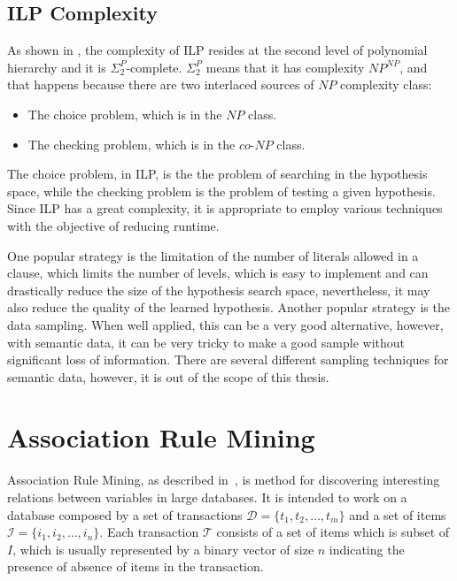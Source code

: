 \subsection{ILP Complexity}

As shown in \citet{DBLP:journals/ngc/GottlobLS99}, the complexity of ILP resides at the second level of polynomial
hierarchy and it is $\Sigma_2^P$-complete. $\Sigma_2^P$ means that it has complexity $NP^{NP}$, and that happens
because there are two interlaced sources of $NP$ complexity class:
\begin{itemize}
 \item The choice problem, which is in the $NP$ class.
 \item The checking problem, which is in the $co$-$NP$ class.
\end{itemize}

The choice problem, in ILP, is the the problem of searching in the hypothesis space, while the checking problem is the
problem of testing a given hypothesis. Since ILP has a great complexity, it is appropriate to employ various techniques
with the objective of reducing runtime.

One popular strategy is the limitation of the number of literals allowed in a clause, which limits the number of
levels, which is easy to implement and can drastically reduce the size of the hypothesis search space, nevertheless, it
may also reduce the quality of the learned hypothesis. Another popular strategy is the data sampling. When well applied,
this can be a very good alternative, however, with semantic data, it can be very tricky to make a good sample without
significant loss of information. There are several different sampling techniques for semantic data, however, it is out
of the scope of this thesis.


\section{Association Rule Mining}
\label{sec:rw-arm}

Association Rule Mining, as described in~\citet{Agrawal:1993:MAR:170036.170072}, is method for discovering interesting
relations between variables in large databases. It is intended to work on a database composed by a set of transactions
$\mathcal{D}=\{t_1,t_2,\ldots,t_m\}$ and a set of items $\mathcal{I}=\{i_1,i_2,\ldots,i_n\}$. Each transaction
$\mathcal{T}$ consists of a set of items which is subset of $I$, which is usually represented by a binary vector of size
$n$ indicating the presence of absence of items in the
transaction.

